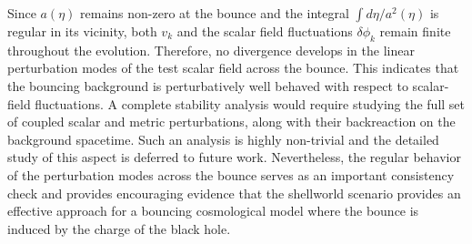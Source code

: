 \documentclass[12pt]{article}
\begin{document}
Since $a(\eta)$ remains non-zero at the bounce and the integral $\int d \eta/a^2(\eta)$ is regular in its vicinity, both $v_k$ and the scalar field fluctuations $\delta \phi_k$ remain finite throughout the evolution. Therefore, no divergence develops in the linear perturbation modes of the test scalar field across the bounce. This indicates that the bouncing background is perturbatively well behaved with respect to scalar-field fluctuations. A complete stability analysis would require studying the full set of coupled scalar and metric perturbations, along with their backreaction on the background spacetime. Such an analysis is highly non-trivial and the detailed study of this aspect is deferred to future work. Nevertheless, the regular behavior of the perturbation modes across the bounce serves as an important consistency check and provides encouraging evidence that the shellworld scenario provides an effective approach for a bouncing cosmological model where the bounce is induced by the charge of the black hole. 
\end{document}
